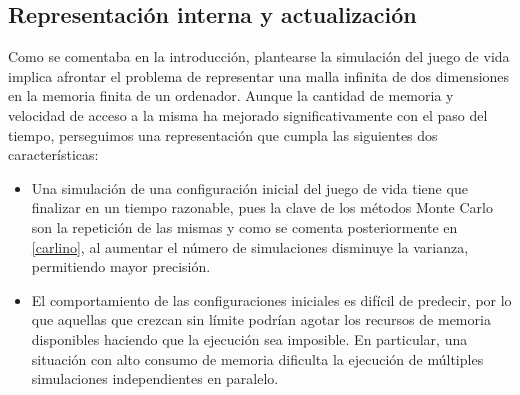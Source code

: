 \documentclass[../proyecto.tex]{memoir}
\begin{document}

\subsection{Representación interna y actualización}

Como se comentaba en la introducción, plantearse la simulación del juego de vida implica afrontar el problema de representar una malla infinita de dos dimensiones en la memoria finita de un ordenador. Aunque la cantidad de memoria y velocidad de acceso a la misma ha mejorado significativamente con el paso del tiempo, perseguimos una representación que cumpla las siguientes dos características:

\begin{itemize}
\item Una simulación de una configuración inicial del juego de vida tiene que finalizar en un tiempo razonable, pues la clave de los métodos Monte Carlo son la repetición de las mismas y como se comenta posteriormente en \ref{carlino}, al aumentar el número de simulaciones disminuye la varianza, permitiendo mayor precisión.

\item El comportamiento de las configuraciones iniciales es difícil de predecir, por lo que aquellas que crezcan sin límite podrían agotar los recursos de memoria disponibles haciendo que la ejecución sea imposible. En particular, una situación con alto consumo de memoria dificulta la ejecución de múltiples simulaciones independientes en paralelo.
\end{itemize}
\end{document}
